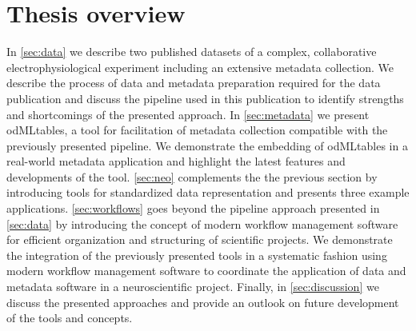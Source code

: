 \section{Thesis overview}
In \cref{sec:data} we describe two published datasets of a complex, collaborative electrophysiological experiment including an extensive metadata collection. We describe the process of data and metadata preparation required for the data publication and discuss the pipeline used in this publication to identify strengths and shortcomings of the presented approach. In \cref{sec:metadata} we present odMLtables, a tool for facilitation of metadata collection compatible with the previously presented pipeline. We demonstrate the embedding of odMLtables in a real-world metadata application and highlight the latest features and developments of the tool. \cref{sec:neo} complements the the previous section by introducing tools for standardized data representation and presents three example applications. \cref{sec:workflows} goes beyond the pipeline approach presented in \cref{sec:data} by introducing the concept of modern workflow management software for efficient organization and structuring of scientific projects. We demonstrate the integration of the previously presented tools in a systematic fashion using modern workflow management software to coordinate the application of data and metadata software in a neuroscientific project. Finally, in \cref{sec:discussion} we discuss the presented approaches and provide an outlook on future development of the tools and concepts.












































